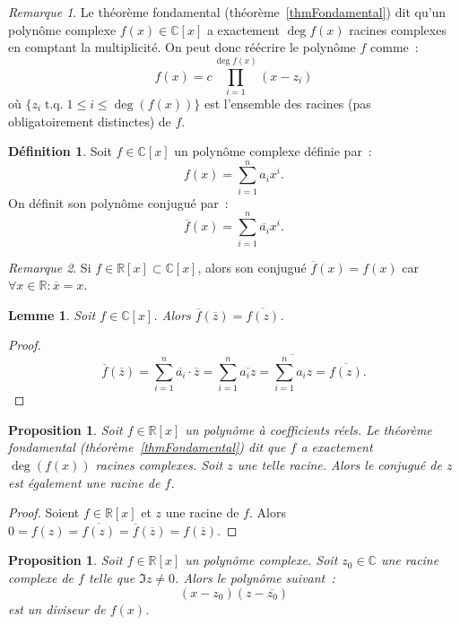 \documentclass{article}
\DeclareMathOperator{\tq}{\text{ t.q. }}
\newcommand{\R}{\mathbb R}
\newcommand{\C}{\mathbb C}
\newtheorem{prp}[thm]{Proposition}
\newtheorem{lem}[thm]{Lemme}
\theoremstyle{definition}
\newtheorem{déf}[thm]{Définition}
\theoremstyle{remark}
\newtheorem*{rmq}{Remarque}
\begin{document}
		\begin{rmq} Le théorème fondamental (théorème~\ref{thmFondamental}) dit qu'un polynôme complexe $f(x) \in \C[x]$ a exactement $\deg f(x)$ racines complexes en
		comptant la multiplicité. On peut donc réécrire le polynôme $f$ comme~: \[f(x) = c\prod_{i=1}^{\deg f(x)}(x-z_i)\] où $\{z_i \tq 1 \leq i \leq \deg(f(x))\}$ est
		l'ensemble des racines (pas obligatoirement distinctes) de $f$.\end{rmq}

		\begin{déf} Soit $f \in \C[x]$ un polynôme complexe définie par~: \[f(x) = \sum_{i=1}^na_ix^i.\] On définit son polynôme conjugué par~:
		\[\overline f(x) = \sum_{i=1}^n\overline {a_i}x^i.\] \end{déf}

		\begin{rmq} Si $f \in \R[x] \subset \C[x]$, alors son conjugué $\overline f(x) = f(x)$ car $\forall x \in \R : \overline x = x$. \end{rmq}

		\begin{lem} Soit $f \in \C[x]$. Alors $\overline f(\overline z) = \overline {f(z)}$. \end{lem}

		\begin{proof} \[\overline f(\overline z) = \sum_{i=1}^n\overline {a_i}\cdot\overline z = \sum_{i=1}^n\overline {a_iz} = \overline {\sum_{i=1}^na_iz} =
		\overline {f(z)}.\] \end{proof}

		\begin{prp} Soit $f \in \R[x]$ un polynôme à coefficients réels. Le théorème fondamental (théorème~\ref{thmFondamental}) dit que $f$ a exactement $\deg(f(x))$
		racines complexes. Soit $z$ une telle racine. Alors le conjugué de $z$ est également une racine de $f$. \end{prp}
		
		\begin{proof} Soient $f \in \R[x]$ et $z$ une racine de $f$. Alors $0 = f(z) = \overline {f(z)} = \overline f(\overline z) = f(\overline z)$. \end{proof}

		\begin{prp} Soit $f \in \R[x]$ un polynôme complexe. Soit $z_0 \in \C$ une racine complexe de $f$ telle que $\Im z \neq 0$. Alors le polynôme suivant~:
		\[(x-z_0)(z-\overline {z_0})\] est un diviseur de $f(x)$. \end{prp}
\end{document}
